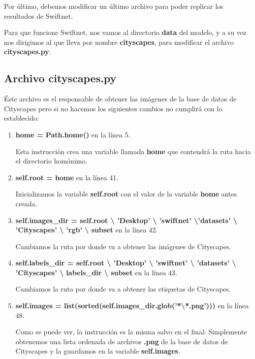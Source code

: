 Por último, debemos modificar un último archivo para poder replicar los resultados de Swiftnet.

Para que funcione Swiftnet, nos vamos al directorio \textbf{data} del modelo, y a su vez nos dirigimos al que lleva por nombre \textbf{cityscapes}, para modificar el archivo \textbf{cityscapes.py}.

\subsection{Archivo cityscapes.py}

Éste archivo es el responsable de obtener las imágenes de la base de datos de Cityscapes pero si no hacemos los siguientes cambios no cumplirá con lo establecido:

\begin{enumerate}
\item \textbf{home = Path.home()} en la línea 5.

Esta instrucción crea una variable llamada \textbf{home} que contendrá la ruta hacia el directorio homónimo.

\item \textbf{self.root = home} en la línea 41.

Inicializamos la variable \textbf{self.root} con el valor de la variable \textbf{home} antes creada.

\item \textbf{self.images\_dir = self.root \textbackslash{} 'Desktop' \textbackslash{} 'swiftnet' \textbackslash{}'datasets' \textbackslash{} 'Cityscapes' \textbackslash{} 'rgb' \textbackslash{} subset} en la línea 42.

Cambiamos la ruta por donde va a obtener las imágenes de Cityscapes.

\item \textbf{self.labels\_dir = self.root \textbackslash{} 'Desktop' \textbackslash{} 'swiftnet' \textbackslash{} 'datasets' \textbackslash{} 'Cityscapes' \textbackslash{} labels\_dir \textbackslash{} subset} en la línea 43.

Cambiamos la ruta por donde va a obtener las etiquetas de Cityscapes.

\item \textbf{self.images = list(sorted(self.images\_dir.glob('*\textbackslash{*.png}')))} en la línea 48.

Como se puede ver, la instrucción es la misma salvo en el final: Simplemente obtenemos una lista ordenada de archivos \textbf{.png} de la base de datos de Cityscapes y la guardamos en la variable \textbf{self.images}.
\end{enumerate}

